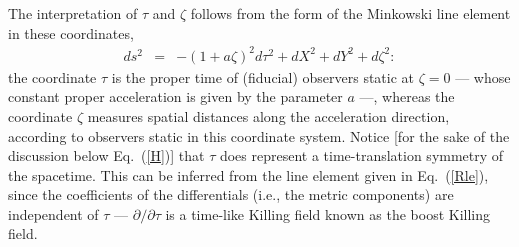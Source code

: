 \documentclass[]{nature}
\begin{document}
{%
The interpretation of  $\tau$ and $\zeta$ follows from the form of the Minkowski line element in these coordinates,
\begin{eqnarray}
ds^2&=&
-(1+a\zeta)^2 d\tau^2+dX^2+dY^2+d\zeta^2:
\label{Rle}
\end{eqnarray}
the coordinate $\tau$ is the proper time of (fiducial) observers static at $\zeta = 0$ ---
whose constant proper acceleration is given by the parameter  $a$ ---, whereas 
the coordinate $\zeta$ measures spatial distances along the acceleration direction, according to observers static in this coordinate system.
Notice [for the sake of the discussion below Eq.~(\ref{H})] that $\tau$ does represent a time-translation symmetry of the spacetime. This can be inferred from the line element
given in Eq.~(\ref{Rle}), since the coefficients of the differentials (i.e., the  metric components) are independent of $\tau$ --- $\partial/\partial \tau$ is
a time-like Killing field known as the  boost Killing field.

}
\end{document}
